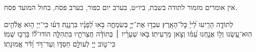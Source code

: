 \negline

\begin{narrow}
	\begin{scriptsize} %
		\textsf{
			אין אומרים מזמור לתודה בשבת, ביו״ט, בערב יום כפור, בערב פסח, בחול המועד פסח.\\
	}\end{scriptsize}
	 לְתוֹדָ֑ה
	הָרִ֥יעוּ לַ֝ייָ֗ כׇּל־הָאָֽרֶץ׃
	עִבְד֣וּ אֶת־יְיָ֣ בְּשִׂמְחָ֑ה בֹּ֥אוּ לְ֝פָנָ֗יו בִּרְנָנָֽה׃
	דְּע֗וּ כִּֽי־יְיָ ה֤וּא אֱלֹ֫הִ֥ים הֽוּא־עָ֭שָׂנוּ וְל֣וֹ אֲנַ֑חְנוּ עַ֝מּ֗וֹ וְצֹ֣אן מַרְעִיתֽוֹ׃
	בֹּ֤אוּ שְׁעָרָ֨יו ׀ בְּתוֹדָ֗ה חֲצֵרֹתָ֥יו בִּתְהִלָּ֑ה הוֹדוּ־ל֗֝וֹ בָּרְכ֥וּ שְׁמֽוֹ׃
	כִּי־ט֣וֹב יְיָ֭ לְעוֹלָ֣ם חַסְדּ֑וֹ וְעַד־דֹּ֥ר וָ֝דֹ֗ר אֱמוּנָתֽוֹ׃
\end{narrow}
